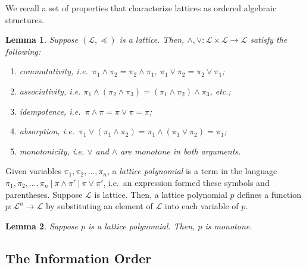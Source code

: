 \documentclass[conference]{ieeeconf}
\renewcommand{\L}{\mathcal{L}}
\newcommand{\join}{\vee}
\newcommand{\meet}{\wedge}
\DeclareMathOperator{\Atoms}{At}
\newtheorem{lemma}{Lemma}
\begin{document}
We recall a set of properties that characterize lattices as ordered algebraic structures.

\begin{lemma} \label{lem:lattice-axiom} 
    Suppose $(\L,\preceq)$ is a lattice. Then, $\meet, \join: \L \times \L \to \L$ satisfy the following:
    \begin{enumerate}
        \item \emph{commutativity}, i.e.~$\pi_1 \meet \pi_2 = \pi_2 \meet \pi_1$, $\pi_1 \join \pi_2 = \pi_2 \join \pi_1$;
        \item \emph{associativity}, i.e. {\small $\pi_1 \meet (\pi_2 \meet \pi_3) = (\pi_1 \meet \pi_2) \meet \pi_3$}, etc.;
        \item \emph{idempotence}, i.e.~$\pi \meet \pi = \pi \join \pi =  \pi$;
        \item \emph{absorption}, i.e.~$\pi_1 \join \left( \pi_1 \meet \pi_2 \right) = \pi_1 \meet \left( \pi_1 \join \pi_2 \right) = \pi_1$;
        \item \emph{monotonicity}, i.e. $\join$ and $\meet$ are monotone in both arguments.
    \end{enumerate}
\end{lemma}

Given variables $\pi_1,\pi_2,\dots,\pi_n$, a \emph{lattice polynomial} is a term in the language $\pi_1,\pi_2,\dots,\pi_n~\vert~\pi \meet \pi'~\vert~\pi \join \pi'$, i.e.~an expression formed these symbols and parentheses. Suppose $\L$ is  lattice. Then, a lattice polynomial $p$ defines a function $p: \L^n \to \L$ by substituting an element of $\L$ into each variable of $p$.

\begin{lemma}\label{lem:lattice-poly}
    Suppose $p$ is a lattice polynomial. Then, $p$ is monotone.
\end{lemma}



\subsection{The Information Order}
\end{document}
